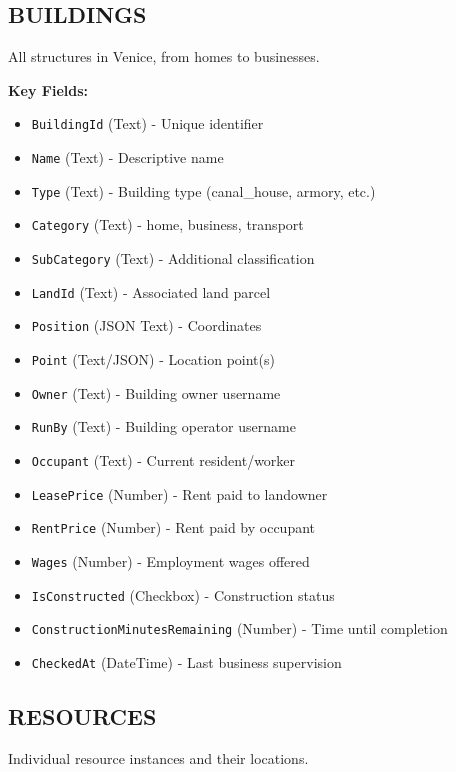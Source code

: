 \documentclass[11pt,a4paper]{article}
\begin{document}
\subsection{BUILDINGS}

All structures in Venice, from homes to businesses.

\textbf{Key Fields:}
\begin{itemize}
\item \texttt{BuildingId} (Text) - Unique identifier
\item \texttt{Name} (Text) - Descriptive name
\item \texttt{Type} (Text) - Building type (canal\_house, armory, etc.)
\item \texttt{Category} (Text) - home, business, transport
\item \texttt{SubCategory} (Text) - Additional classification
\item \texttt{LandId} (Text) - Associated land parcel
\item \texttt{Position} (JSON Text) - Coordinates
\item \texttt{Point} (Text/JSON) - Location point(s)
\item \texttt{Owner} (Text) - Building owner username
\item \texttt{RunBy} (Text) - Building operator username
\item \texttt{Occupant} (Text) - Current resident/worker
\item \texttt{LeasePrice} (Number) - Rent paid to landowner
\item \texttt{RentPrice} (Number) - Rent paid by occupant
\item \texttt{Wages} (Number) - Employment wages offered
\item \texttt{IsConstructed} (Checkbox) - Construction status
\item \texttt{ConstructionMinutesRemaining} (Number) - Time until completion
\item \texttt{CheckedAt} (DateTime) - Last business supervision
\end{itemize}

\subsection{RESOURCES}

Individual resource instances and their locations.
\end{document}
